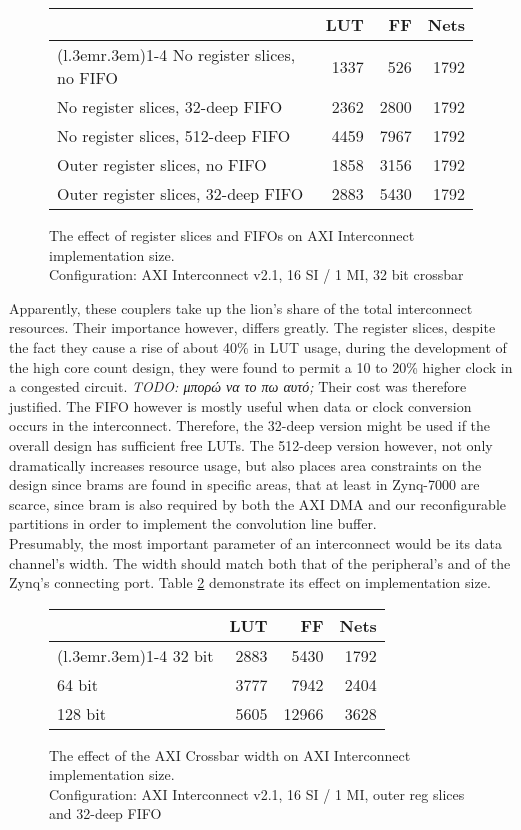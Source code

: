 \begin{figure}[ht!]
\centering
\begin{tabular}{lrrr}
\toprule
	& LUT	& FF	& Nets \\
\cmidrule(l{.3em}r{.3em}){1-4}
No register slices, no FIFO		& 1337 & 526 & 1792 \\
No register slices, 32-deep FIFO	& 2362 & 2800 & 1792 \\
No register slices, 512-deep FIFO	& 4459 & 7967 & 1792 \\
Outer register slices, no FIFO		& 1858 & 3156 & 1792 \\
Outer register slices, 32-deep FIFO	& 2883 & 5430 & 1792 \\
\bottomrule
\end{tabular}
\caption{The effect of register slices and FIFOs on AXI Interconnect implementation size.\\
	Configuration: AXI Interconnect v2.1, 16 SI / 1 MI, 32 bit crossbar}
\label{tab:int-reg}
\end{figure}

Apparently, these couplers take up the lion's share of the total interconnect resources.
Their importance however, differs greatly. 
The register slices, despite the fact they cause a rise of about 40\% in LUT usage,
during the development of the high core count design,
they were found to permit a 10 to 20\% higher clock in a congested circuit. 
\emph{TODO: μπορώ να το πω αυτό;}
Their cost was therefore justified. 
The FIFO however is mostly useful when data or clock conversion occurs in the
interconnect. Therefore, the 32-deep version might be used if the overall design
has sufficient free LUTs. The 512-deep version however,
not only dramatically increases resource usage, but also places area constraints on
the design since \glspl{bram} are found in specific areas, that at least in Zynq-7000
are scarce, since \gls{bram} is also required by both the AXI DMA and our reconfigurable
partitions in order to implement the convolution line buffer.
\\

Presumably, the most important parameter of an interconnect would be its data channel's width. 
The width should match both that of the peripheral's and of the Zynq's connecting port.
Table \ref{tab:int-width} demonstrate its effect on implementation size.

\begin{figure}[ht!]
\centering
\begin{tabular}{lrrr}
\toprule
	& LUT	& FF	& Nets \\
\cmidrule(l{.3em}r{.3em}){1-4}
32 bit	& 2883	& 5430	& 1792 \\
64 bit	& 3777	& 7942	& 2404 \\
128 bit	& 5605	& 12966	& 3628 \\
\bottomrule
\end{tabular}
\caption{The effect of the AXI Crossbar width on AXI Interconnect implementation size.\\
	Configuration: AXI Interconnect v2.1, 16 SI / 1 MI, outer reg slices and 32-deep FIFO}
\label{tab:int-width}
\end{figure}

